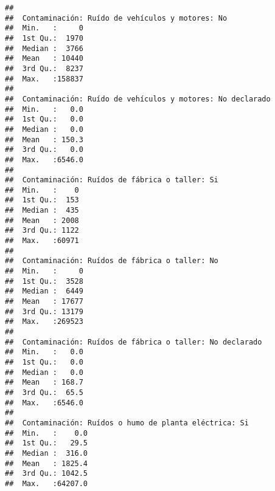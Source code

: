 \documentclass[11pt,]{article}
\begin{document}
\begin{verbatim}
##                                                 
##  Contaminación: Ruído de vehículos y motores: No
##  Min.   :     0                                 
##  1st Qu.:  1970                                 
##  Median :  3766                                 
##  Mean   : 10440                                 
##  3rd Qu.:  8237                                 
##  Max.   :158837                                 
##                                                 
##  Contaminación: Ruído de vehículos y motores: No declarado
##  Min.   :   0.0                                           
##  1st Qu.:   0.0                                           
##  Median :   0.0                                           
##  Mean   : 150.3                                           
##  3rd Qu.:   0.0                                           
##  Max.   :6546.0                                           
##                                                           
##  Contaminación: Ruídos de fábrica o taller: Si
##  Min.   :    0                                
##  1st Qu.:  153                                
##  Median :  435                                
##  Mean   : 2008                                
##  3rd Qu.: 1122                                
##  Max.   :60971                                
##                                               
##  Contaminación: Ruídos de fábrica o taller: No
##  Min.   :     0                               
##  1st Qu.:  3528                               
##  Median :  6449                               
##  Mean   : 17677                               
##  3rd Qu.: 13179                               
##  Max.   :269523                               
##                                               
##  Contaminación: Ruídos de fábrica o taller: No declarado
##  Min.   :   0.0                                         
##  1st Qu.:   0.0                                         
##  Median :   0.0                                         
##  Mean   : 168.7                                         
##  3rd Qu.:  65.5                                         
##  Max.   :6546.0                                         
##                                                         
##  Contaminación: Ruídos o humo de planta eléctrica: Si
##  Min.   :    0.0                                     
##  1st Qu.:   29.5                                     
##  Median :  316.0                                     
##  Mean   : 1825.4                                     
##  3rd Qu.: 1042.5                                     
##  Max.   :64207.0                                     

\end{verbatim}
\end{document}
